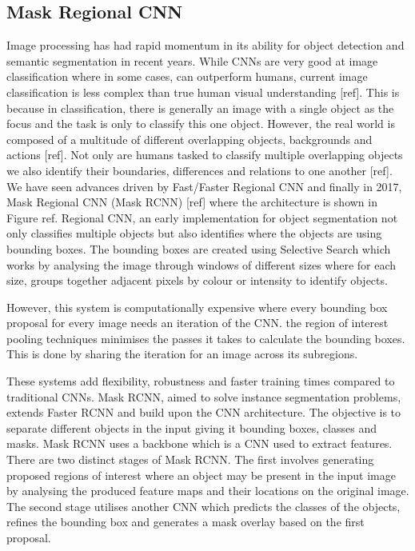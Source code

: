 \subsection{Mask Regional CNN}
Image processing has had rapid momentum in its ability for object detection and semantic segmentation in recent years. While CNNs are very good at image classification where in some cases, can outperform humans, current image classification is less complex than true human visual understanding [ref]. This is because in classification, there is generally an image with a single object as the focus and the task is only to classify this one object. However, the real world is composed of a multitude of different overlapping objects, backgrounds and actions [ref]. Not only are humans tasked to classify multiple overlapping objects we also identify their boundaries, differences and relations to one another [ref]. 
We have seen advances driven by Fast/Faster Regional CNN and finally in 2017, Mask Regional CNN (Mask RCNN) [ref] where the architecture is shown in Figure ref. Regional CNN, an early implementation for object segmentation not only classifies multiple objects but also identifies where the objects are using bounding boxes. The bounding boxes are created using Selective Search which works by analysing the image through windows of different sizes where for each size, groups together adjacent pixels by colour or intensity to identify objects. 

However, this system is computationally expensive  where every bounding box proposal for every image needs an iteration of the CNN. the region of interest pooling techniques minimises the passes it takes to calculate the bounding boxes. This is done by sharing the iteration for an image across its subregions.  

These systems add flexibility, robustness and faster training times compared to traditional CNNs. Mask RCNN, aimed to solve instance segmentation problems, extends Faster RCNN and build upon the CNN architecture. The objective is to separate different objects in the input giving it bounding boxes, classes and masks. Mask RCNN uses a backbone which is a CNN used to extract features. There are two distinct stages of Mask RCNN. The first involves generating proposed regions of interest where an object may be present in the input image by analysing the produced feature maps and their locations on the original image. The second stage utilises another CNN which predicts the classes of the objects, refines the bounding box and generates a mask overlay based on the first proposal.


